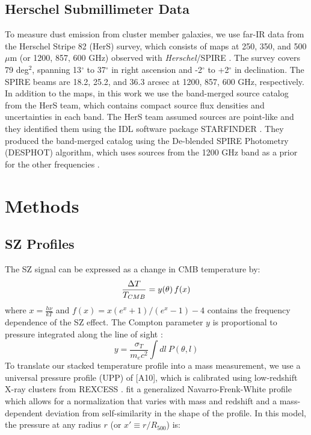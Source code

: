 \documentclass[a4paper,fleqn,usenatbib]{mnras}
\begin{document}
\subsection{Herschel Submillimeter Data}
To measure dust emission from cluster member galaxies, we use far-IR data from the Herschel Stripe 82 (HerS) survey, which consists of maps at 250, 350, and 500 $\mu$m (or 1200, 857, 600 GHz) observed with \textit{Herschel}/SPIRE \citep{2014ApJS..210...22V}. The survey covers 79 deg$^2$, spanning 13$^{\circ}$ to 37$^{\circ}$ in right ascension and -2$^{\circ}$ to +2$^{\circ}$ in declination. 
The SPIRE beams are 18.2, 25.2, and 36.3 arcsec at 1200, 857, 600 GHz, respectively. In addition to the maps, in this work we use the band-merged source catalog from the HerS team, which contains compact source flux densities and uncertainties in each band. The HerS team assumed sources are point-like and they identified them using the IDL software package STARFINDER \citep{2000A&AS..147..335D}. They produced the band-merged catalog using the De-blended SPIRE Photometry (DESPHOT) algorithm, which uses sources from the 1200 GHz band as a prior for the other frequencies \citep{2010MNRAS.409...48R}.


\section{Methods} \label{sec:methods}

\subsection{SZ Profiles}
The SZ signal can be expressed as a change in CMB temperature by: 
\begin{equation}
\centering
  \frac{\Delta T}{T_{CMB}} = y( \theta ) \, f( x )
\end{equation}
where $x = \frac{h \nu}{k T}$ and $f(x) = x ({e^{x} + 1})/{(e^{x}-1)} - 4$ contains the frequency dependence of the SZ effect. The Compton parameter $y$ is proportional to pressure integrated along the line of sight \citep{1972CoASP...4..173S,1970CoASP...2...66S}:
\begin{equation}
  y = \frac{\sigma_{T}}{m_{e} c^{2}} \int dl\  P(\theta, l) \end{equation}
To translate our stacked temperature profile into a mass measurement, we use a universal pressure profile (UPP) of \cite{2010A&A...517A..92A} [A10], which is calibrated using low-redshift X-ray clusters from REXCESS \citep{2007A&A...469..363B}. \citeauthor{2010A&A...517A..92A} fit a generalized Navarro-Frenk-White profile which allows for a normalization that varies with mass and redshift and a mass-dependent deviation from self-similarity in the shape of the profile. In this model, the pressure at any radius $r$ (or $x' \equiv r/R_{500}$) is:
\end{document}

